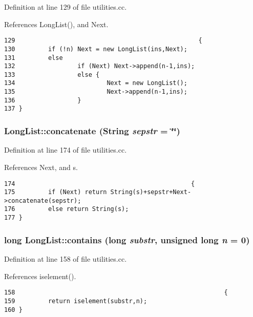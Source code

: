 Definition at line 129 of file utilities.cc.

References Long\-List(), and Next.



\footnotesize\begin{verbatim}129                                                  {
130         if (!n) Next = new LongList(ins,Next);
131         else
132                 if (Next) Next->append(n-1,ins);
133                 else {
134                         Next = new LongList();
135                         Next->append(n-1,ins);
136                 }
137 }
\end{verbatim}\normalsize 
{}
\subsubsection{ Long\-List::concatenate ({\bf String} {\em sepstr} = \char`\"{}\char`\"{})}\label{classLongList_a13}




Definition at line 174 of file utilities.cc.

References Next, and s.



\footnotesize\begin{verbatim}174                                                {
175         if (Next) return String(s)+sepstr+Next->concatenate(sepstr);
176         else return String(s);
177 }
\end{verbatim}\normalsize 
{}
\subsubsection{\setlength{\rightskip}{0pt plus 5cm}long Long\-List::contains (long {\em substr}, unsigned long {\em n} = 0)}\label{classLongList_a11}




Definition at line 158 of file utilities.cc.

References iselement().



\footnotesize\begin{verbatim}158                                                         {
159         return iselement(substr,n);
160 }
\end{verbatim}\normalsize 
{}
